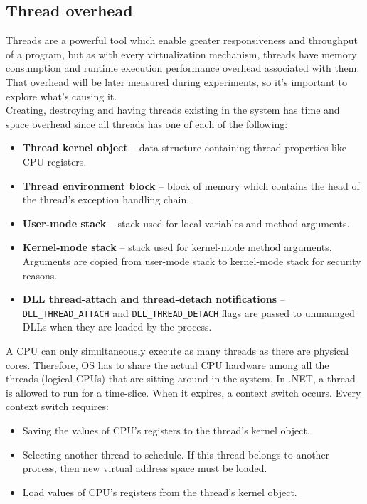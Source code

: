 \subsection{Thread overhead}
Threads are a powerful tool which enable greater responsiveness and throughput of a program, but as with every virtualization mechanism, threads have memory consumption and runtime execution performance overhead associated with them. That overhead will be later measured during experiments, so it's important to explore what's causing it. \\

Creating, destroying and having threads existing in the system has time and space overhead since all threads has one of each of the following:
\begin{itemize}
	\item \textbf{Thread kernel object} --  data structure containing thread properties like CPU registers.
	\item \textbf{Thread environment block} --  block of memory which contains the head of the thread's exception handling chain.
	\item \textbf{User-mode stack} -- stack used for local variables and method arguments.
	\item \textbf{Kernel-mode stack} -- stack used for kernel-mode method arguments. Arguments are copied from user-mode stack to kernel-mode stack for security reasons.
	\item \textbf{DLL thread-attach and thread-detach notifications} -- \texttt{DLL\_THREAD\_ATTACH} and \texttt{DLL\_THREAD\_DETACH} flags are passed to unmanaged DLLs when they are loaded by the process.
\end{itemize}

A CPU can only simultaneously execute as many threads as there are physical cores. Therefore, OS has to share the actual CPU hardware among all the threads (logical CPUs) that are sitting around in the system. In .NET, a thread is allowed to run for a time-slice. When it expires, a context switch occurs. Every context switch requires:
\begin{itemize}
	\item Saving the values of CPU's registers to the thread's kernel object.
	\item Selecting another thread to schedule. If this thread belongs to another process, then new virtual address space must be loaded.
	\item Load values of CPU's registers from the thread's kernel object.
\end{itemize}

